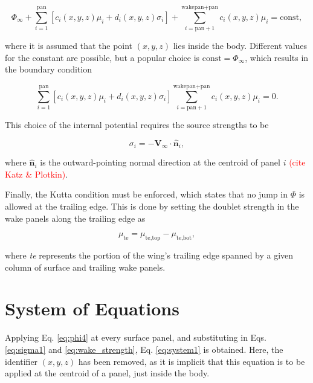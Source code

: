 \documentclass[11pt]{article}
\begin{document}
\begin{equation}
   \Phi_\infty
 + \sum_{i=1}^{\text{pan}}\left[c_i(x,y,z)\mu_i + d_i(x,y,z)\sigma_i\right]
 + \sum_{i=\text{pan}+1}^{\text{wakepan}+\text{pan}}c_i(x,y,z)\mu_i = \text{const},
\label{eq:phi3}
\end{equation}

\noindent where it is assumed that the point $(x,y,z)$ lies inside the body. Different
values for the constant are possible, but a popular choice is $\text{const} =
\Phi_\infty$, which results in the boundary condition

\begin{equation}
\sum_{i=1}^{\text{pan}}\left[c_i(x,y,z)\mu_i + d_i(x,y,z)\sigma_i\right]
\sum_{i=\text{pan}+1}^{\text{wakepan}+\text{pan}}c_i(x,y,z)\mu_i = 0.
\label{eq:phi4}
\end{equation}

This choice of the internal potential requires the source strengths to be

\begin{equation}
\sigma_i = -\mathbf{V}_\infty\cdot\mathbf{\hat{n}}_i,
\label{eq:sigma1}
\end{equation}

\noindent where $\mathbf{\hat{n}}_i$ is the outward-pointing normal direction at
the centroid of panel $i$ \textcolor{red}{(cite Katz \& Plotkin)}.

Finally, the Kutta condition must be enforced, which states that no jump in $\Phi$ is
allowed at the trailing edge. This is done by setting the doublet strength in the wake
panels along the trailing edge as

\begin{equation}
\mu_{\text{te}} = \mu_{\text{te,top}} - \mu_{\text{te,bot}},
\label{eq:wake_strength}
\end{equation}

\noindent where \emph{te} represents the portion of the wing's trailing edge
spanned by a given column of surface and trailing wake panels.

\section{System of Equations}

Applying Eq. \ref{eq:phi4} at every surface panel, and substituting in Eqs.
\ref{eq:sigma1} and \ref{eq:wake_strength}, Eq. \ref{eq:system1} is obtained.
Here, the identifier $(x,y,z)$ has been removed, as it is implicit that this equation is
to be applied at the centroid of a panel, just inside the body.
\end{document}
